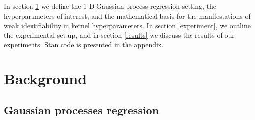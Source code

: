 \documentclass{article}
\begin{document}
In section \ref{background} we define the 1-D Gaussian process regression setting,
the hyperparameters of interest, and the mathematical basis for the manifestations
of weak identifiability in kernel hyperparameters. In section \ref{experiment}, we 
outline the experimental set up, and in section \ref{results} we discuss the results 
of our experiments. Stan code is presented in the appendix.

\section{Background} \label{background}

\subsection{Gaussian processes regression}
\end{document}
